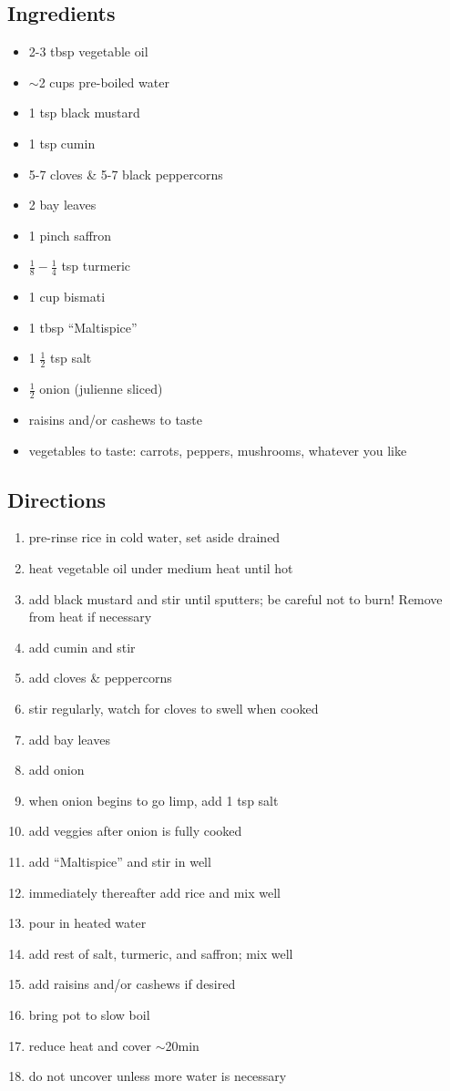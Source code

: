 \documentclass[12pt]{article}
\begin{document}
\subsection*{Ingredients}
\begin{itemize}
   \item 2-3 tbsp vegetable oil
   \item $\sim$2 cups pre-boiled water
   \item 1 tsp black mustard
   \item 1 tsp cumin
   \item 5-7 cloves \& 5-7 black peppercorns 
   \item 2 bay leaves
   \item 1 pinch saffron
   \item $\frac{1}{8} - \frac{1}{4}$ tsp turmeric
   \item 1 cup bismati
   \item 1 tbsp ``Maltispice''
   \item 1 $\frac{1}{2}$ tsp salt
   \item $\frac{1}{2}$ onion (julienne sliced)
   \item raisins and/or cashews to taste
   \item vegetables to taste: carrots, peppers, mushrooms, whatever you like
\end{itemize}


\subsection*{Directions}
\begin{enumerate}
   \item pre-rinse rice in cold water, set aside drained
   \item heat vegetable oil under medium heat until hot 
   \item add black mustard and stir until sputters; be careful not to burn! Remove from heat if necessary
   \item add cumin and stir
   \item add cloves \& peppercorns 
   \item stir regularly, watch for cloves to swell when cooked 
   \item add bay leaves
   \item add onion
   \item when onion begins to go limp, add 1 tsp salt
   \item add veggies after onion is fully cooked
   \item add ``Maltispice'' and stir in well
   \item immediately thereafter add rice and mix well
   \item pour in heated water
   \item add rest of salt, turmeric, and saffron; mix well
   \item add raisins and/or cashews if desired
   \item bring pot to slow boil
   \item reduce heat and cover $\sim$20min
   \item do not uncover unless more water is necessary
\end{enumerate}
\end{document}
